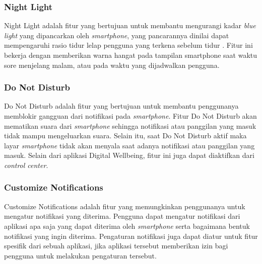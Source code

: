 \subsubsection{Night Light}
Night Light adalah fitur yang bertujuan untuk membantu mengurangi kadar \textit{blue light} yang dipancarkan oleh \textit{smartphone}, yang pancarannya dinilai dapat mempengaruhi rasio tidur lelap pengguna yang terkena sebelum tidur \parencite{ISHIZAWA2021303}. Fitur ini bekerja dengan memberikan warna hangat pada tampilan smartphone saat waktu sore menjelang malam, atau pada waktu yang dijadwalkan pengguna. \parencite{android2019digitalwellbeing}

\subsubsection{Do Not Disturb}
Do Not Disturb adalah fitur yang bertujuan untuk membantu penggunanya memblokir gangguan dari notifikasi pada \textit{smartphone}. Fitur Do Not Disturb akan mematikan suara dari \textit{smartphone} sehingga notifikasi atau panggilan yang masuk tidak mampu mengeluarkan suara. Selain itu, saat Do Not Disturb aktif maka layar \textit{smartphone} tidak akan menyala saat adanya notifikasi atau panggilan yang masuk. \parencite{android2019digitalwellbeing} Selain dari aplikasi Digital Wellbeing, fitur ini juga dapat diaktifkan dari \textit{control center}.

\subsubsection{Customize Notifications}
Customize Notifications adalah fitur yang memungkinkan penggunanya untuk mengatur notifikasi yang diterima. Pengguna dapat mengatur notifikasi dari aplikasi apa saja yang dapat diterima oleh \textit{smartphone} serta bagaimana bentuk notifikasi yang ingin diterima. Pengaturan notifikasi juga dapat diatur untuk fitur spesifik dari sebuah aplikasi, jika aplikasi tersebut memberikan izin bagi pengguna untuk melakukan pengaturan tersebut. 
